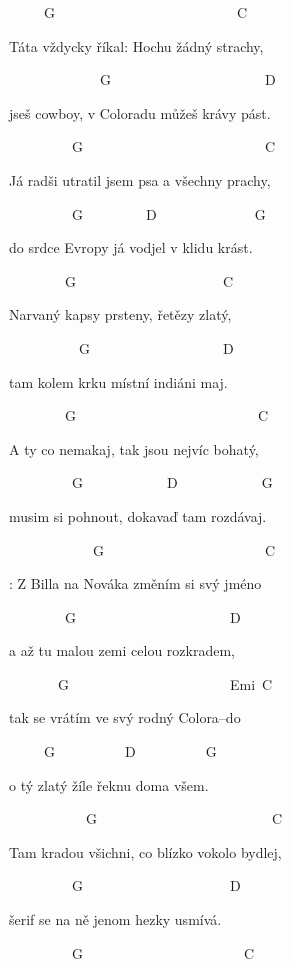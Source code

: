 
~~~~~G~~~~~~~~~~~~~~~~~~~~~~~~~~C

Táta vždycky říkal: Hochu žádný strachy,

~~~~~~~~~~~~~G~~~~~~~~~~~~~~~~~~~~~~D

jseš cowboy, v Coloradu můžeš krávy pást.

~~~~~~~~~G~~~~~~~~~~~~~~~~~~~~~~~~~~C

Já radši utratil jsem psa a všechny prachy,

~~~~~~~~~G~~~~~~~~~D~~~~~~~~~~~~~~G
         
do srdce Evropy já vodjel v klidu krást.

\bigskip

~~~~~~~~G~~~~~~~~~~~~~~~~~~~~~C

Narvaný kapsy prsteny, řetězy zlatý,

~~~~~~~~~~G~~~~~~~~~~~~~~~~~~~D

tam kolem krku místní indiáni maj.

~~~~~~~~G~~~~~~~~~~~~~~~~~~~~~~~~~~C

A ty co nemakaj, tak jsou nejvíc bohatý,

~~~~~~~~~G~~~~~~~~~~~~D~~~~~~~~~~~~G

musim si pohnout, dokavaď tam rozdávaj.

\bigskip

\begin{chorustext}

~~~~~~~~~~~~G~~~~~~~~~~~~~~~~~~~~~~~C

\chorus: Z Billa na Nováka změním si svý jméno

~~~~~~~~G~~~~~~~~~~~~~~~~~~~~~~D

a až tu malou zemi celou rozkradem,

~~~~~~~G~~~~~~~~~~~~~~~~~~~~~~~Emi~C

tak se vrátím ve svý rodný Colora--do

~~~~~G~~~~~~~~~~D~~~~~~~~~~G

o tý zlatý žíle řeknu doma všem.
\end{chorustext}

\bigskip

~~~~~~~~~~~G~~~~~~~~~~~~~~~~~~~~~~~~~C

Tam kradou všichni, co blízko vokolo bydlej,

~~~~~~~~~G~~~~~~~~~~~~~~~~~~~~~D

šerif se na ně jenom hezky usmívá.

~~~~~~~~~G~~~~~~~~~~~~~~~~~~~~~~~C

